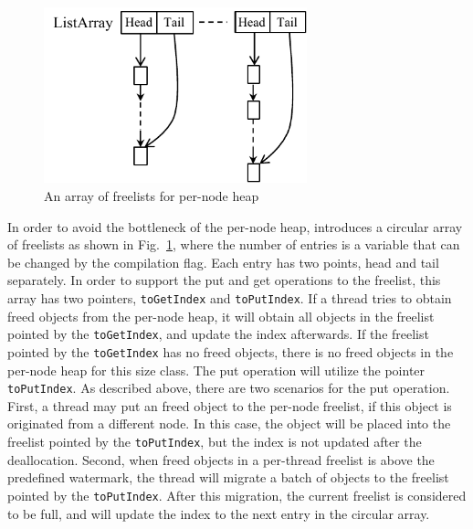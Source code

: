 \begin{figure}
\centering
\includegraphics[width=3in]{figure/listarray}
\vspace{-0.1in}
\caption{An array of freelists for per-node heap\label{fig:listarray}}
\vspace{-0.2in}
\end{figure}
In order to avoid the bottleneck of the per-node heap, \NM{} introduces a circular array of freelists as shown in Fig.~\ref{fig:listarray}, where the number of entries is a variable that can be changed by the compilation flag. Each entry has two points, head and tail separately. In order to support the put and get operations to the freelist, this array has two pointers, \texttt{toGetIndex} and  \texttt{toPutIndex}. If a thread tries to obtain freed objects from the per-node heap, it will obtain all objects in the freelist pointed by the \texttt{toGetIndex}, and update the index afterwards. If the freelist pointed by the \texttt{toGetIndex} has no freed objects, there is no freed objects in the per-node heap for this size class.  The put operation will utilize the pointer \texttt{toPutIndex}. As described above, there are two scenarios for the put operation. First, a thread may put an freed object to the per-node freelist, if this object is originated from a different node. In this case, the object will be placed into the freelist pointed by the \texttt{toPutIndex}, but the index is not updated after the deallocation. Second, when freed objects in a per-thread freelist is above the predefined watermark, the thread will migrate a batch of objects to the freelist pointed by the \texttt{toPutIndex}. After this migration, the current freelist is considered to be full, and will update the index to the next entry in the circular array.

   

 


